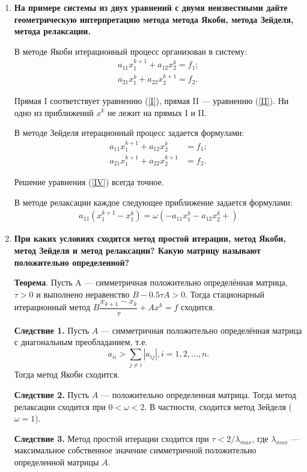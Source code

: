 \documentclass[12pt, a4paper]{article}
\begin{document}
\begin{enumerate}
		\item\textbf{На примере системы из двух уравнений с двумя неизвестными дайте геометрическую интерпретацию метода метода Якоби, метода Зейделя, метода релаксации.}
		
		В методе Якоби итерационный процесс организован в систему:
		\begin{align}
			a_{11}x_1^{k+1}+a_{12}x_2^k=f_1;\label{I} \\
			a_{21}x_1^{k}+a_{22}x_2^{k+1}=f_2.\label{II}
		\end{align}
		
		Прямая I соответствует уравнению (\ref{I}), прямая II --- уравнению (\ref{II}). Ни одно из приближений $x^k$ не лежит на прямых I и II.
		
		В методе Зейделя итерационный процесс задается формулами:
		\begin{align}
			a_{11}x_1^{k+1}+a_{12}x_2^k&=f_1;\label{III} \\
			a_{21}x_1^{k+1}+a_{22}x_2^{k+1}&=f_2.\label{IV}
		\end{align}
		
		Решение уравнения (\ref{IV}) всегда точное.
		
		В методе релаксации каждое следующее приближение задается формулами:
		\begin{align}
			a_{11}(x_1^{k+1}-x_1^k)=\omega(-a_{11}x_1^k-a_{12}x_2^k+)
		\end{align}
				
		\item\textbf{При каких условиях сходятся метод простой итерации, метод Якоби, метод Зейделя и метод релаксации? Какую матрицу называют положительно определенной?}
		
		\textbf{Теорема}. Пусть A --- симметричная положительно определённая матрица, $\tau>0$ и выполнено неравенство $B-0.5\tau A>0$. Тогда стационарный итерационный метод $B\dfrac{x_{k+1}-x_k}{\tau}+Ax^k=f$ сходится.
		
		\textbf{Следствие 1.} Пусть $A$ --- симметричная положительно определённая матрица с диагональным преобладанием, т.е.
		$$
		a_{ii}>\sum_{j\neq i}|a_{ij}|, i = 1,2,\ldots,n.
		$$
		Тогда метод Якоби сходится.
		
		\textbf{Следствие 2.} Пусть $A$ --- положительно определенная матрица. Тогда метод релаксации сходится при $0<\omega<2$. В частности, сходится метод Зейделя ($\omega=1$).
		
		\textbf{Следствие 3.} Метод простой итерации сходится при $\tau<2/\lambda_{max}$, где $\lambda_{max}$ --- максимальное собственное значение симметричной положительно определенной матрицы $A$.
		

\end{enumerate}
\end{document}
